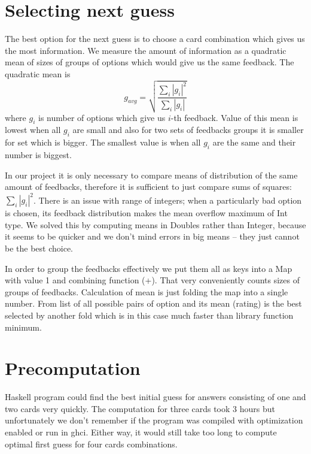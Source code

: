 \documentclass{article}
\begin{document}
\section{Selecting next guess}

The best option for the next guess is to choose a card combination which gives us the most information.
We measure the amount of information as a quadratic mean of sizes of groups of options which would give us the same feedback.
The quadratic mean is $$ g_{avg} = \sqrt{\frac{\sum_i |g_i|^2}{\sum_i |g_i|}}$$ where $g_i$ is number of options which give us $i$-th feedback.
Value of this mean is lowest when all $g_i$ are small and also for two sets of feedbacks groups it is smaller for set which is bigger.
The smallest value is when all $g_i$ are the same and their number is biggest.

In our project it is only necessary to compare means of distribution of the same amount of feedbacks, therefore it is sufficient to just compare sums of squares: $\sum_i |g_i|^2$.
There is an issue with range of integers; when a particularly bad option is chosen, its feedback distribution makes the mean overflow maximum of Int type.
We solved this by computing means in Doubles rather than Integer, because it seems to be quicker and we don't mind errors in big means -- they just cannot be the best choice.

In order to group the feedbacks effectively we put them all as keys into a Map with value 1 and combining function (+).
That very conveniently counts sizes of groups of feedbacks.
Calculation of mean is just folding the map into a single number.
From list of all possible pairs of option and its mean (rating) is the best selected by another fold which is in this case much faster than library function minimum.

\section{Precomputation}

Haskell program could find the best initial guess for answers consisting of one and two cards very quickly.
The computation for three cards took 3 hours but unfortunately we don't remember if the program was compiled with optimization enabled or run in ghci.
Either way, it would still take too long to compute optimal first guess for four cards combinations.
\end{document}
